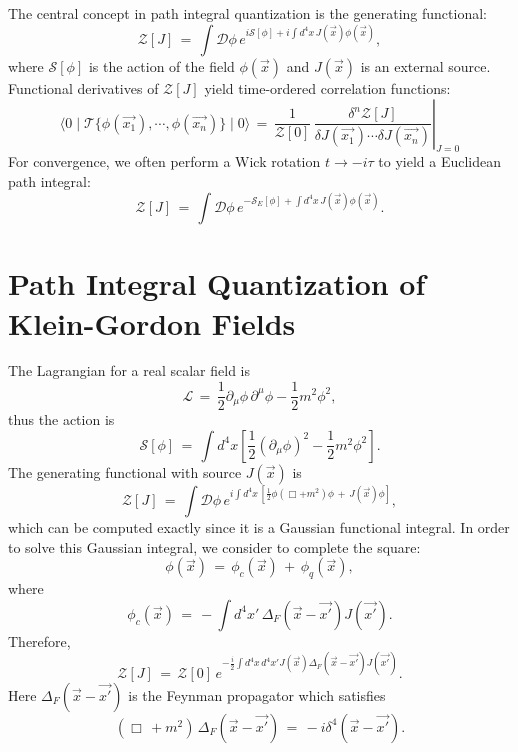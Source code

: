 \documentclass[11pt]{article}
\numberwithin{equation}{section}
\begin{document}
The central concept in path integral quantization is the generating functional:
\begin{equation}
    \mathcal Z[J]\,=\,\int\!\mathcal D\phi\,e^{i\mathcal S[\phi]+i\int\!d^4x\,J(\Vec{x})\phi(\Vec{x})},
\end{equation}
where $\mathcal{S}[\phi]$ is the action of the field $\phi(\Vec{x})$ and $J(\Vec{x})$ is an external source.\\
Functional derivatives of $\mathcal{Z}[J]$ yield time-ordered correlation functions:
\begin{equation}
    \langle0\mid\mathcal T\{\phi(\Vec{x_1}),\cdots,\phi(\Vec{x_n})\}\mid0\rangle\,=\,\left.\frac{1}{\mathcal{Z}[0]}\,\frac{\delta^n\mathcal{Z}[J]}{\delta J(\Vec{x_1})\cdots\delta J(\Vec{x_n})}\right|_{J=0}
\end{equation}
For convergence, we often perform a Wick rotation $t\rightarrow -i\tau$ to yield a Euclidean path integral:
\begin{equation}
    \mathcal{Z}[J]\,=\,\int\!\mathcal{D}\phi\,e^{-\mathcal{S}_{E}[\phi]+\int\!d^4x\,J(\Vec{x})\phi(\Vec{x})}.
\end{equation}

\section{Path Integral Quantization of Klein-Gordon Fields}
The Lagrangian for a real scalar field is
\begin{equation}
    \mathcal{L}\,=\,\frac{1}{2}\partial_\mu\phi\,\partial^\mu\phi-\frac{1}{2}m^2\phi^2,
\end{equation}
thus the action is
\begin{equation}
    \mathcal{S}[\phi]\,=\,\int\!d^4x[\frac{1}{2}(\partial_\mu\phi)^2-\frac{1}{2}m^2\phi^2].
\end{equation}
The generating functional with source $J(\Vec{x})$ is
\begin{equation}
    \mathcal{Z}[J]\,=\,\int\!\mathcal{D}\phi\,e^{i\int\!d^4x\,\left[\frac{1}{2}\phi(\Box+m^2)\phi\,+\,J(\Vec{x})\phi\right]},
\end{equation}
which can be computed exactly since it is a Gaussian functional integral.
In order to solve this Gaussian integral, we consider to complete the square:
\begin{equation}
    \phi(\Vec{x})\,=\,\phi_c(\Vec{x})\,+\,\phi_q(\Vec{x}),
\end{equation}
where
\begin{equation}
    \phi_c(\Vec{x})\,=\,-\int\!d^4x'\,\Delta_F(\Vec{x}-\Vec{x'})J(\Vec{x'}).
\end{equation}
Therefore,
\begin{equation}
    \mathcal{Z}[J]\,=\,\mathcal{Z}[0]\,e^{-\frac{i}{2}\int\!d^4x\,d^4x'J(\Vec{x})\Delta_F(\Vec{x}-\Vec{x'})J(\Vec{x'})}.
\end{equation}
Here $\Delta_F(\Vec{x}-\Vec{x'})$ is the Feynman propagator which satisfies
\begin{equation}
    (\Box\,+m^2)\,\Delta_F(\Vec{x}-\Vec{x'})\,=\,-i\delta^4(\Vec{x}-\Vec{x'}).
\end{equation}
\end{document}
